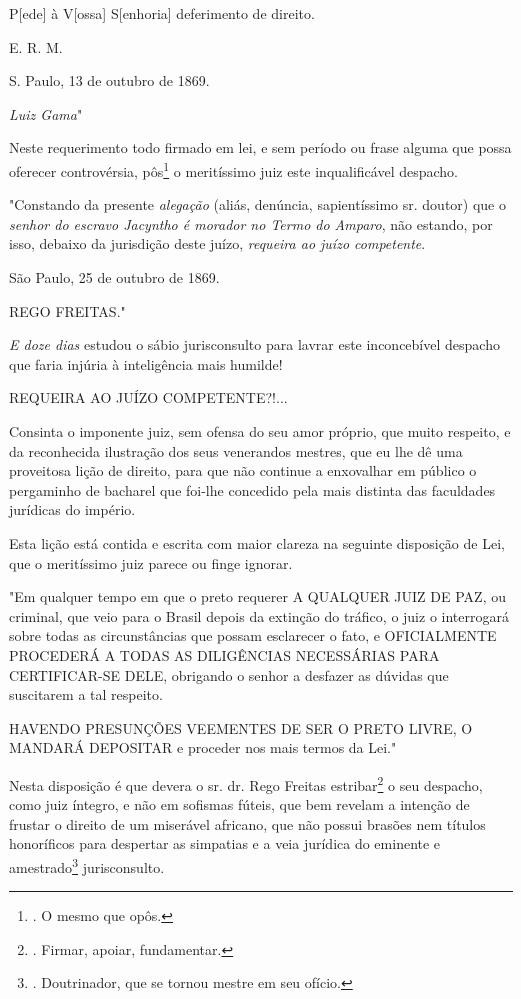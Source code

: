 P{[}ede{]} à V{[}ossa{]} S{[}enhoria{]} deferimento de direito.

E. R. M.

S. Paulo, 13 de outubro de 1869.

\emph{Luiz Gama}"

Neste requerimento todo firmado em lei, e sem período ou frase alguma
que possa oferecer controvérsia, pôs\footnote{. O mesmo que opôs.} o
meritíssimo juiz este inqualificável despacho.

"Constando da presente \emph{alegação} (aliás, denúncia, sapientíssimo
sr. doutor) que o \emph{senhor do escravo Jacyntho é morador no Termo do
Amparo}, não estando, por isso, debaixo da jurisdição deste juízo,
\emph{requeira ao juízo competente}.

São Paulo, 25 de outubro de 1869.

REGO FREITAS."

\emph{E doze dias} estudou o sábio jurisconsulto para lavrar este
inconcebível despacho que faria injúria à inteligência mais humilde!

REQUEIRA AO JUÍZO COMPETENTE?!...

Consinta o imponente juiz, sem ofensa do seu amor próprio, que muito
respeito, e da reconhecida ilustração dos seus venerandos mestres, que
eu lhe dê uma proveitosa lição de direito, para que não continue a
enxovalhar em público o pergaminho de bacharel que foi-lhe concedido
pela mais distinta das faculdades jurídicas do império.

Esta lição está contida e escrita com maior clareza na seguinte
disposição de Lei, que o meritíssimo juiz parece ou finge ignorar.

"Em qualquer tempo em que o preto requerer A QUALQUER JUIZ DE PAZ, ou
criminal, que veio para o Brasil depois da extinção do tráfico, o juiz o
interrogará sobre todas as circunstâncias que possam esclarecer o fato,
e OFICIALMENTE PROCEDERÁ A TODAS AS DILIGÊNCIAS NECESSÁRIAS PARA
CERTIFICAR-SE DELE, obrigando o senhor a desfazer as dúvidas que
suscitarem a tal respeito.

HAVENDO PRESUNÇÕES VEEMENTES DE SER O PRETO LIVRE, O MANDARÁ DEPOSITAR e
proceder nos mais termos da Lei."

Nesta disposição é que devera o sr. dr. Rego Freitas estribar\footnote{.
  Firmar, apoiar, fundamentar.} o seu despacho, como juiz íntegro, e não
em sofismas fúteis, que bem revelam a intenção de frustar o direito de
um miserável africano, que não possui brasões nem títulos honoríficos
para despertar as simpatias e a veia jurídica do eminente e
amestrado\footnote{. Doutrinador, que se tornou mestre em seu ofício.}
jurisconsulto.

